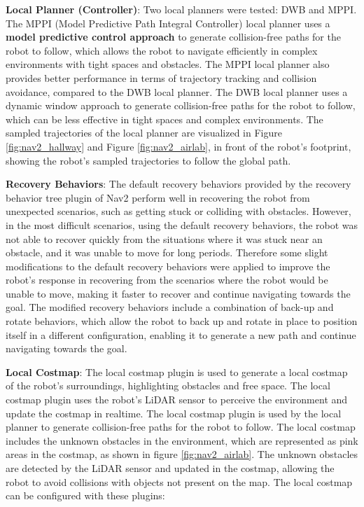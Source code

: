 \textbf{Local Planner (Controller)}:
Two local planners were tested: DWB and MPPI.
The MPPI (Model Predictive Path Integral Controller) \cite{mppicontroller}
local planner uses a \textbf{model predictive control approach}
to generate collision-free paths for the robot to follow, which allows the robot to navigate efficiently in complex
environments with tight spaces and obstacles. The MPPI local planner also provides better performance in terms of
trajectory tracking and collision avoidance, compared to the DWB local planner. 
The DWB local planner uses a dynamic window approach to generate
collision-free paths for the robot to follow, which can be less effective in tight spaces and complex environments.
The sampled trajectories of the local planner are visualized in Figure \ref{fig:nav2_hallway} and Figure \ref{fig:nav2_airlab},
in front of the robot's footprint, showing the robot's sampled trajectories to follow the global path.

\textbf{Recovery Behaviors}:
The default recovery behaviors provided by the recovery behavior tree plugin of Nav2
perform well in recovering the robot from unexpected scenarios, such as getting stuck or colliding with obstacles.
However, in the most difficult scenarios, using the default recovery behaviors, the robot was not able to recover quickly
from the situations where it was stuck near an obstacle, and it was unable to move for long periods.
Therefore some slight modifications to the default recovery behaviors were applied to improve the robot's response
in recovering from the scenarios where the robot would be unable to move, making it faster to recover and continue
navigating towards the goal. The modified recovery behaviors
include a combination of back-up and rotate behaviors, which allow the robot to back up and rotate in place to position
itself in a different configuration, enabling it to generate a new path and continue navigating towards the goal.

\textbf{Local Costmap}:
The local costmap plugin is used to generate a local costmap of the robot's surroundings, highlighting obstacles
and free space. The local costmap plugin uses the robot's LiDAR sensor to perceive the environment and update the costmap
in realtime. The local costmap plugin is used by the local planner to generate collision-free paths for the robot
to follow. The local costmap includes the unknown obstacles in the environment, which are represented as pink areas
in the costmap, as shown in figure \ref{fig:nav2_airlab}. The unknown obstacles are detected by the LiDAR sensor
and updated in the costmap, allowing the robot to avoid collisions with objects not present on the map.
The local costmap can be configured with these plugins:

